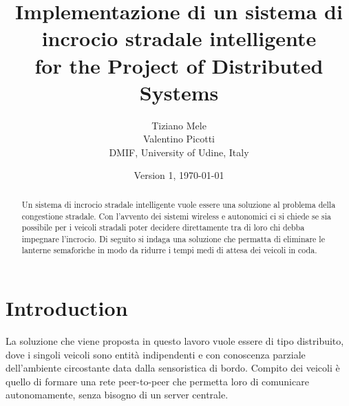 \documentclass{memoir}
\title{Implementazione di un sistema di incrocio stradale intelligente \\ for the Project of Distributed Systems}
\author{Tiziano Mele\\Valentino Picotti\\DMIF, University of Udine, Italy}
\date{Version 1, \today}
\begin{document}
\maketitle
\begin{abstract}
  Un sistema di incrocio stradale intelligente vuole essere una soluzione al
  problema della congestione stradale. Con l'avvento dei sistemi wireless e
  autonomici ci si chiede se sia possibile per i veicoli stradali poter decidere
  direttamente tra di loro chi debba impegnare l'incrocio. Di seguito si indaga
  una soluzione che permatta di eliminare le lanterne semaforiche in modo da
  ridurre i tempi medi di attesa dei veicoli in coda.
\end{abstract}

\chapter{Introduction}\label{ch:intro}

La soluzione che viene proposta in questo lavoro vuole essere di tipo
distribuito, dove i singoli veicoli sono entità indipendenti e con conoscenza
parziale dell'ambiente circostante data dalla sensoristica di bordo. Compito dei
veicoli è quello di formare una rete peer-to-peer che permetta loro di
comunicare autonomamente, senza bisogno di un server centrale.

\end{document}
